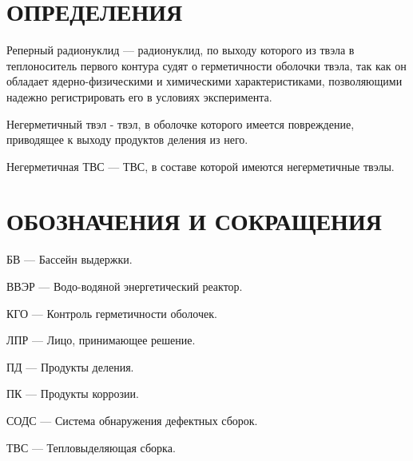 \documentclass[a4paper,12pt]{article}
\begin{document}
\pagebreak
\thispagestyle{empty}

\section*{\centering ОПРЕДЕЛЕНИЯ}

\thispagestyle{empty} %

Реперный радионуклид --- радионуклид, по выходу которого из твэла в
теплоноситель первого контура судят о герметичности оболочки твэла, так как
он обладает ядерно-физическими и химическими характеристиками,
позволяющими надежно регистрировать его в условиях эксперимента.

Негерметичный твэл - твэл, в оболочке которого имеется повреждение,
приводящее к выходу продуктов деления из него.

Негерметичная ТВС --- ТВС, в составе которой имеются негерметичные твэлы.

\pagebreak

\section*{\centering ОБОЗНАЧЕНИЯ И СОКРАЩЕНИЯ}

\thispagestyle{empty} %

БВ --- Бассейн выдержки.

ВВЭР --- Водо-водяной энергетический реактор.

КГО --- Контроль герметичности оболочек.

ЛПР --- Лицо, принимающее решение.

ПД --- Продукты деления.

ПК --- Продукты коррозии.

СОДС --- Система обнаружения дефектных сборок.

ТВС --- Тепловыделяющая сборка.

\pagebreak


\tableofcontents

\thispagestyle{empty}

\pagebreak

\setcounter{page}{3}
\end{document}
